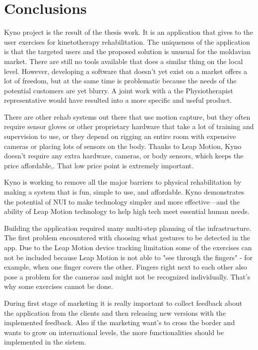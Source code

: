 \section*{Conclusions}

Kyno project is the result of the thesis work. It is an application that gives to the user exercises for kinetotherapy rehabilitation. The uniqueness of the application is that the targeted users and the proposed solution is unusual for the moldavian market. There are still no tools available that does a similar thing on the local level. However, developing a software that doesn't yet exist on a market offers a lot of freedom, but at the same time is problematic because the needs of the potential customers are yet blurry. A joint work with a the Physiotherapist representative would have resulted into a more specific and useful product.

There are other rehab systems out there that use motion capture, but they often require sensor gloves or other proprietary hardware that take a lot of training and supervision to use, or they depend on rigging an entire room with expensive cameras or placing lots of sensors on the body. Thanks to Leap Motion, Kyno doesn’t require any extra hardware, cameras, or body sensors, which keeps the price affordable,. That low price point is extremely important.

Kyno is working to remove all the major barriers to physical rehabilitation by making a system that is fun, simple to use, and affordable. Kyno demonstrates the potential of NUI to make technology simpler and more effective—and the ability of Leap Motion technology to help high tech meet essential human needs.

Building the application required many multi-step planning of the infrastructure. The first problem encountered with choosing what gestures to be detected in the app. Due to the Leap Motion device tracking limitation some of the exercises can not be included because Leap Motion is not able to "see through the fingers" - for example, when one finger covers the other. Fingers right next to each other also pose a problem for the cameras and might not be recognized individually. That's why some exercises cannot be done.


During first stage of marketing it is really important to collect feedback about the application from the clients and then releasing new versions with the implemented feedback. Also if the marketing want's to cross the border and wants to grow on international levels, the more functionalities should be implemented in the sistem.

